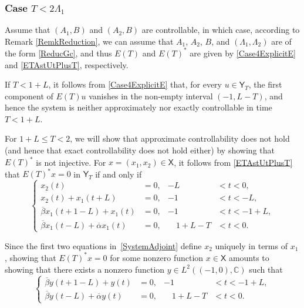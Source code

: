 \subsubsection{\texorpdfstring{Case $T < 2 \Lambda_1$}{Case T < 2 Lambda1}}

Assume that $(A_1, B)$ and $(A_2, B)$ are controllable, in which case, according to Remark \ref{RemkReduction}, we can assume that $A_1$, $A_2$, $B$, and $(\Lambda_1, \Lambda_2)$ are of the form \eqref{ReducGc}, and thus $E(T)$ and $E(T)^\ast$ are given by \eqref{Case4ExplicitE} and \eqref{ETAstUtPlusT}, respectively.

If $T < 1 + L$, it follows from \eqref{Case4ExplicitE} that, for every $u \in \mathsf Y_T$, the first component of $E(T) u$ vanishes in the non-empty interval $(-1, L - T)$, and hence the system is neither approximately nor exactly controllable in time $T < 1 + L$.

For $1 + L \leq T < 2$, we will show that approximate controllability does not hold (and hence that exact controllability does not hold either) by showing that $E(T)^\ast$ is not injective. For $x = (x_1, x_2) \in \mathsf X$, it follows from \eqref{ETAstUtPlusT} that $E(T)^\ast x = 0$ in $\mathsf Y_T$ if and only if
\begin{equation}
\label{SystemAdjoint}
\left\{
\begin{aligned}
x_2(t) & = 0, & -L & < t < 0, \\
x_2(t) + x_1(t + L) & = 0, & -1 & < t < -L, \\
\overline\beta x_1(t + 1 - L) + x_1(t) & = 0, & -1 & < t < -1 + L, \\
\overline\beta x_1(t - L) + \overline\alpha x_1(t) & = 0, & \quad 1 + L - T & < t < 0.
\end{aligned}
\right.
\end{equation}

Since the first two equations in~\eqref{SystemAdjoint} define $x_2$ uniquely in terms of $x_1$, showing that $E(T)^\ast x = 0$ for some nonzero function $x \in \mathsf X$ amounts to showing that there exists a nonzero function $y \in L^2((-1, 0), \mathbb C)$ such that
\begin{equation}
\label{EquationV}
\left\{
\begin{aligned}
\overline\beta y(t + 1 - L) + y(t) & = 0, & -1 & < t < -1 + L, \\
\overline\beta y(t - L) + \overline\alpha y(t) & = 0, & \quad 1 + L - T & < t < 0.
\end{aligned}
\right.
\end{equation}

